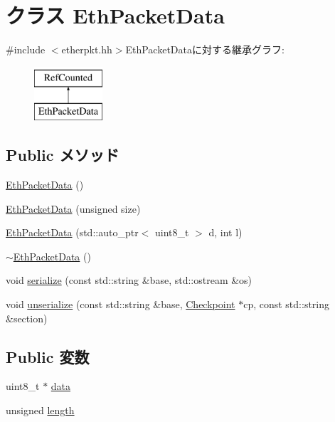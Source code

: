 \hypertarget{classEthPacketData}{
\section{クラス EthPacketData}
\label{classEthPacketData}
}


{\ttfamily \#include $<$etherpkt.hh$>$}EthPacketDataに対する継承グラフ:\begin{figure}[H]
\begin{center}
\leavevmode
\includegraphics[height=2cm]{classEthPacketData}
\end{center}
\end{figure}
\subsection*{Public メソッド}
\begin{DoxyCompactItemize}
\item 
\hyperlink{classEthPacketData_a5b5e616c7286e5e5ef54307815246475}{EthPacketData} ()
\item 
\hyperlink{classEthPacketData_ac88f28d8c09dbe55bedbe2c4082234be}{EthPacketData} (unsigned size)
\item 
\hyperlink{classEthPacketData_a0410e0f8c3bb79bfc5dadb18e0ee6b4c}{EthPacketData} (std::auto\_\-ptr$<$ uint8\_\-t $>$ d, int l)
\item 
\hyperlink{classEthPacketData_a42d7ba93f45b5a9e6f858c3beeff9743}{$\sim$EthPacketData} ()
\item 
void \hyperlink{classEthPacketData_ab4138b21b48e3371a8e20df72b675a88}{serialize} (const std::string \&base, std::ostream \&os)
\item 
void \hyperlink{classEthPacketData_a147c320e3d6506edf5587a40cd8e430d}{unserialize} (const std::string \&base, \hyperlink{classCheckpoint}{Checkpoint} $\ast$cp, const std::string \&section)
\end{DoxyCompactItemize}
\subsection*{Public 変数}
\begin{DoxyCompactItemize}
\item 
uint8\_\-t $\ast$ \hyperlink{classEthPacketData_abe222f6d3581e7920dcad5306cc906a8}{data}
\item 
unsigned \hyperlink{classEthPacketData_ac94dc16b22556ba5fa815655f27442da}{length}
\end{DoxyCompactItemize}


